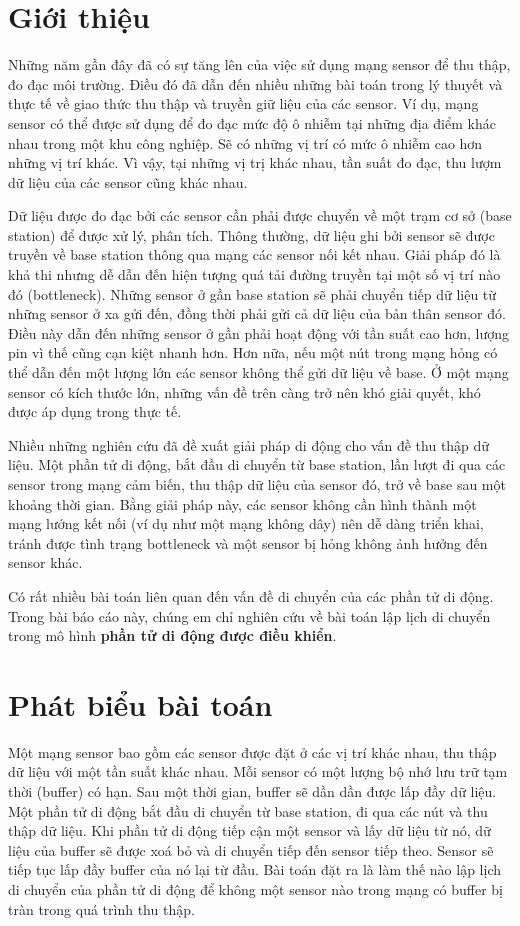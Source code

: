 \documentclass[12pt]{report}
\begin{document}
\tableofcontents
\newpage 

\section{Giới thiệu}
Những năm gần đây đã có sự tăng lên của việc sử dụng mạng sensor để thu thập, đo đạc môi trường. Điều đó đã dẫn đến nhiều những bài toán trong lý thuyết và thực tế về giao thức thu thập và truyền giữ liệu của các sensor.  Ví dụ, mạng sensor có thể được sử dụng để đo đạc mức độ ô nhiễm tại những địa điểm khác nhau trong một khu công nghiệp. Sẽ có những vị trí có mức ô nhiễm cao hơn những vị trí khác. Vì vậy, tại những vị trị khác nhau, tần suất đo đạc, thu lượm dữ liệu của các sensor cũng khác nhau. 
	
	Dữ liệu được đo đạc bởi các sensor cần phải được chuyển về một trạm  cơ sở (base station) để được xử lý, phân tích. Thông thường, dữ liệu ghi bởi sensor sẽ được truyền về base station thông qua mạng các sensor nối kết nhau. Giải pháp đó là khả thi nhưng dễ dẫn đến hiện tượng quá tải đường truyền tại một số vị trí nào đó (bottleneck). Những sensor ở gần base station sẽ phải chuyển tiếp dữ liệu từ những sensor ở xa gửi đến, đồng thời phải gửi cả dữ liệu của bản thân sensor đó. Điều này dẫn đến những sensor ở gần phải hoạt động với tần suất cao hơn, lượng pin vì thế cũng cạn kiệt nhanh hơn. Hơn nữa, nếu một nút trong mạng hỏng có thể dẫn đến một lượng lớn các sensor không thể gửi dữ liệu về base. Ở một mạng sensor có kích thước lớn, những vấn đề trên càng trở nên khó giải quyết, khó được áp dụng trong thực tế. 
	
	Nhiều những nghiên cứu đã đề xuất giải pháp di động cho vấn đề thu thập dữ liệu. Một phần tử di động, bắt đầu di chuyển từ base station, lần lượt đi qua các sensor trong mạng cảm biến, thu thập dữ liệu của sensor đó, trở về base sau một khoảng thời gian. Bằng giải pháp này, các sensor không cần hình thành một mạng lướng kết nối (ví dụ như một mạng không dây) nên dễ dàng triển khai, tránh được tình trạng bottleneck và một sensor bị hỏng không ảnh hưởng đến sensor khác. 
	
	Có rất nhiều bài toán liên quan đến vấn đề di chuyển của các phần tử di động. Trong bài báo cáo này, chúng em chỉ nghiên cứu về bài toán lập lịch di chuyển trong mô hình \textbf{phần tử di động được điều khiển}. 
	
\section{Phát biểu bài toán}
Một mạng sensor bao gồm các sensor được đặt ở các vị trí khác nhau, thu thập dữ liệu với một tần suất khác nhau. Mỗi sensor có một lượng bộ nhớ lưu trữ tạm thời (buffer) có hạn. Sau một thời gian, buffer sẽ dần dần được lấp đầy dữ liệu. Một phần tử di động bắt đầu di chuyển từ base station, đi qua các nút và thu thập dữ liệu. Khi phần tử di động tiếp cận một sensor và lấy dữ liệu từ nó, dữ liệu của buffer sẽ được xoá bỏ và di chuyển tiếp đến sensor tiếp theo. Sensor sẽ tiếp tục lấp đầy buffer của nó lại từ đầu. Bài toán đặt ra là làm thế nào lập lịch di chuyển của phần tử di động để không một sensor nào trong mạng có buffer bị tràn trong quá trình thu thập. 
\vspace{5mm}
\end{document}
